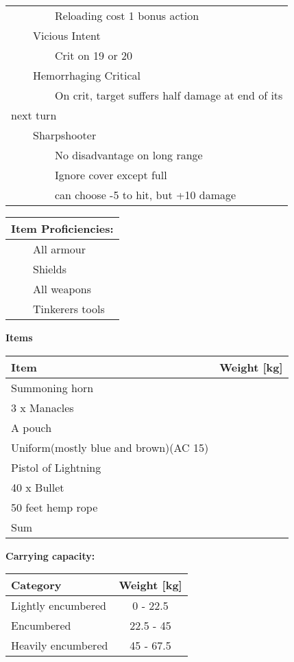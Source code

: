 \documentclass[11pt]{article}
\newcommand{\tabitem}{~~\llap{--}~~}
\newcommand{\tabtabitem}{~~~~~~\llap{$\bullet$}~~}
\begin{document}
\begin{multicols}{2}
\begin{tabularx}{\linewidth}{@{}l}
\tabtabitem Reloading cost 1 bonus action \\
\tabitem Vicious Intent \\
\tabtabitem Crit on 19 or 20 \\
\tabitem Hemorrhaging Critical \\
\tabtabitem On crit, target suffers half damage at end of its \\
next turn \\
\tabitem Sharpshooter \\
\tabtabitem No disadvantage on long range \\
\tabtabitem Ignore cover except full \\
\tabtabitem can choose -5 to hit, but +10 damage
		\end{tabularx}

\vspace{4mm}

\noindent \begin{tabularx}{\linewidth}{@{}l}
{\Large \textbf{Item Proficiencies:}} \\
\hline
\tabitem All armour \\
\tabitem Shields \\
\tabitem All weapons \\
\tabitem Tinkerers tools
		\end{tabularx}
	\end{multicols}

\clearpage

	\begin{center}
{\LARGE \textbf{Items}}
	\end{center}

	\begin{tabularx}{\textwidth}{X|r}
Item & Weight [kg] \\
\hline
Summoning horn								&			\\
3 x Manacles								&			\\
A pouch			 							& 		 	\\
Uniform(mostly blue and brown)(AC 15)		&			\\
Pistol of Lightning							&			\\
40 x Bullet									&			\\
50 feet hemp rope							&			\\
\hline
Sum 										& 
	\end{tabularx}

\vspace{10mm}

\textbf{Carrying capacity:} \\

	\begin{tabular}{l|c}
Category & Weight [kg] \\
\hline
Lightly encumbered 	& 0 - 22.5 	\\
Encumbered 			& 22.5 - 45 \\
Heavily encumbered	& 45 - 67.5
	\end{tabular}
\end{document}
